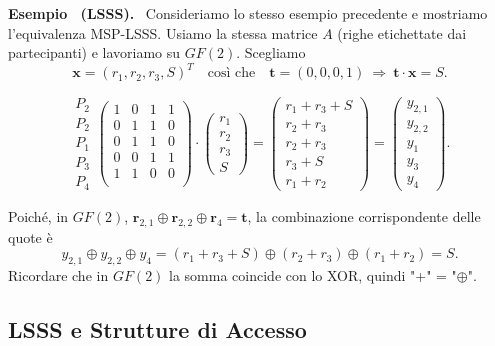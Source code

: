 \documentclass[a4paper, 11pt]{article}
\newenvironment{example}[1][]{
  \par\noindent\textbf{Esempio%
  \if\relax\detokenize{#1}\relax\else\ (\textbf{#1})\fi.}\ }{}
\begin{document}
\begin{example}[LSSS]
Consideriamo lo stesso esempio precedente e mostriamo l'equivalenza MSP-LSSS. Usiamo la stessa matrice $A$ (righe etichettate dai partecipanti) e lavoriamo su $GF(2)$. Scegliamo
\[
\mathbf{x}=(r_1,r_2,r_3,S)^T
\quad\text{così che}\quad
\mathbf{t}=(0,0,0,1)\ \Rightarrow\ \mathbf{t}\cdot\mathbf{x}=S.
\]

\[
\begin{array}{c}
P_2\\ P_2\\ P_1\\ P_3\\ P_4
\end{array}
\left(
\begin{array}{cccc}
1 & 0 & 1 & 1\\
0 & 1 & 1 & 0\\
0 & 1 & 1 & 0\\
0 & 0 & 1 & 1\\
1 & 1 & 0 & 0\\
\end{array}
\right)
\cdot
\begin{pmatrix}
r_1\\ r_2\\ r_3\\ S
\end{pmatrix}
=
\begin{pmatrix}
r_1 + r_3 + S\\
r_2 + r_3\\
r_2 + r_3\\
r_3 + S\\
r_1 + r_2
\end{pmatrix}
=
\begin{pmatrix}
y_{2,1}\\ y_{2,2}\\ y_{1}\\ y_{3}\\ y_{4}
\end{pmatrix}.
\]

Poiché, in $GF(2)$, $\mathbf{r}_{2,1}\oplus \mathbf{r}_{2,2}\oplus \mathbf{r}_{4}=\mathbf{t}$, la combinazione corrispondente delle quote è
\[
y_{2,1}\oplus y_{2,2}\oplus y_{4}
=(r_1{+}r_3{+}S)\oplus(r_2{+}r_3)\oplus(r_1{+}r_2)=S.
\]
Ricordare che in $GF(2)$ la somma coincide con lo XOR, quindi "+" = "$\oplus$".
\end{example}

\subsection{LSSS e Strutture di Accesso}
\end{document}

